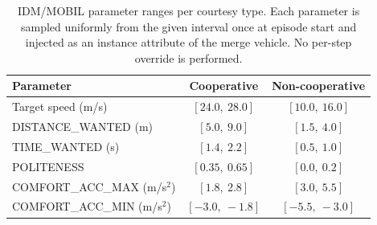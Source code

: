 \begin{table}[htbp]
\centering
\caption{IDM/MOBIL parameter ranges per courtesy type.
  Each parameter is sampled uniformly from the given interval once at episode
  start and injected as an instance attribute of the merge vehicle.
  No per-step override is performed.}
\label{tab:courtesy_params}
\small
\begin{tabular}{lcc}
\toprule
\textbf{Parameter} & \textbf{Cooperative} & \textbf{Non-cooperative} \\
\midrule
Target speed (m/s) & $[24.0,\ 28.0]$ & $[10.0,\ 16.0]$ \\
DISTANCE\_WANTED (m) & $[5.0,\ 9.0]$ & $[1.5,\ 4.0]$ \\
TIME\_WANTED (s) & $[1.4,\ 2.2]$ & $[0.5,\ 1.0]$ \\
POLITENESS & $[0.35,\ 0.65]$ & $[0.0,\ 0.2]$ \\
COMFORT\_ACC\_MAX (m/s$^2$) & $[1.8,\ 2.8]$ & $[3.0,\ 5.5]$ \\
COMFORT\_ACC\_MIN (m/s$^2$) & $[-3.0,\ -1.8]$ & $[-5.5,\ -3.0]$ \\
\bottomrule
\end{tabular}
\end{table}
